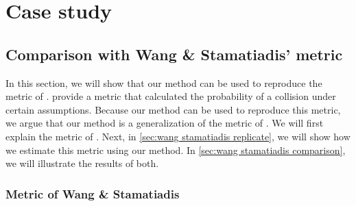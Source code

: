 \section{Case study}
\label{sec:case study}



\subsection{Comparison with Wang \& Stamatiadis' metric}
\label{sec:wang stamatiadis}

In this section, we will show that our method can be used to reproduce the metric of \textcite{wang2014evaluation}.
\textcite{wang2014evaluation} provide a metric that calculated the probability of a collision under certain assumptions. 
Because our method can be used to reproduce this metric, we argue that our method is a generalization of the metric of \textcite{wang2014evaluation}.
We will first explain the metric of \textcite{wang2014evaluation}. 
Next, in \cref{sec:wang stamatiadis replicate}, we will show how we estimate this metric using our method.
In \cref{sec:wang stamatiadis comparison}, we will illustrate the results of both.



\subsubsection{Metric of Wang \& Stamatiadis}
\label{sec:wang stamatiadis explanation}

